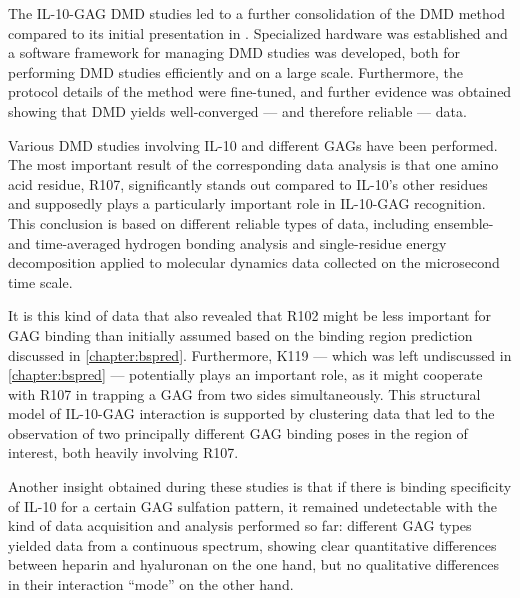The IL-10-GAG DMD studies led to a further consolidation of the DMD method
compared to its initial presentation in \cite{dmd_samsonov_gehrcke_2014}.
Specialized hardware was established and a software framework for managing DMD
studies was developed, both for performing DMD studies efficiently and on a
large scale. Furthermore, the protocol details of the method were fine-tuned,
and further evidence was obtained showing that DMD yields well-converged --- and
therefore reliable --- data.

Various DMD studies involving IL-10 and different GAGs have been performed. The
most important result of the corresponding data analysis is that one amino acid
residue, R107, significantly stands out compared to IL-10's other residues and
supposedly plays a particularly important role in IL-10-GAG recognition. This
conclusion is based on different reliable types of data, including ensemble- and
time-averaged hydrogen bonding analysis and single-residue energy decomposition
applied to molecular dynamics data collected on the microsecond time scale.

It is this kind of data that also revealed that R102 might be less important for
GAG binding than initially assumed based on the binding region prediction
discussed in \cref{chapter:bspred}. Furthermore, K119 --- which was left
undiscussed in \cref{chapter:bspred} --- potentially plays an important role, as
it might cooperate with R107 in trapping a GAG from two sides simultaneously.
This structural model of IL-10-GAG interaction is supported by clustering data
that led to the observation of two principally different GAG binding poses in
the region of interest, both heavily involving R107.

Another insight obtained during these studies is that if there is binding
specificity of IL-10 for a certain GAG sulfation pattern, it remained
undetectable with the kind of data acquisition and analysis performed so far:
different GAG types yielded data from a continuous spectrum, showing clear
quantitative differences between heparin and hyaluronan on the one hand, but no
qualitative differences in their interaction \enquote{mode} on the other hand.
